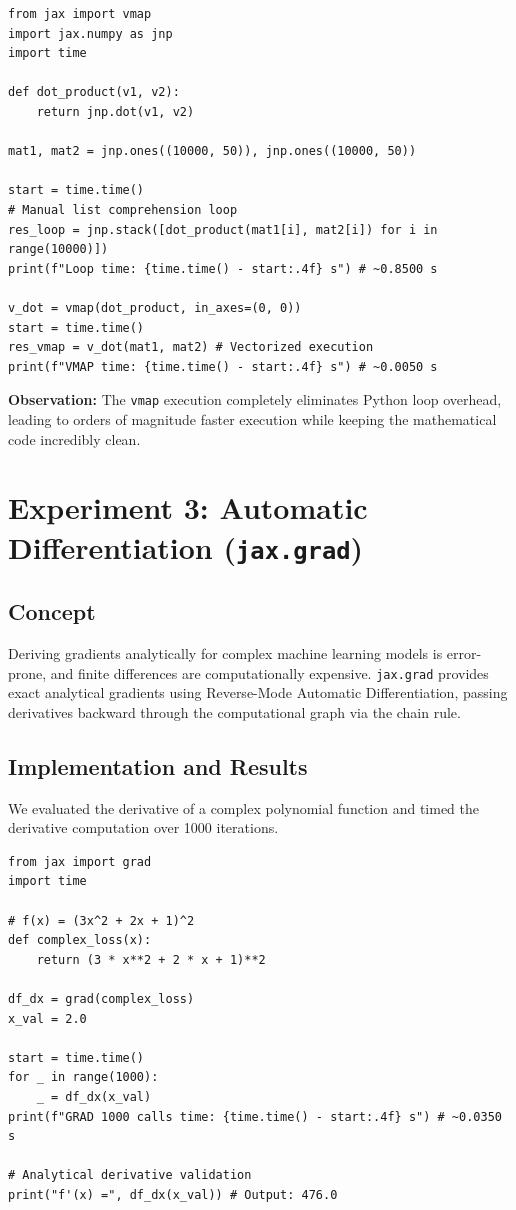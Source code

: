 \documentclass[12pt, a4paper]{article}
\begin{document}
\begin{lstlisting}[caption={VMAP Vectorization Experiment}]
from jax import vmap
import jax.numpy as jnp
import time

def dot_product(v1, v2):
    return jnp.dot(v1, v2)

mat1, mat2 = jnp.ones((10000, 50)), jnp.ones((10000, 50))

start = time.time()
# Manual list comprehension loop
res_loop = jnp.stack([dot_product(mat1[i], mat2[i]) for i in range(10000)])
print(f"Loop time: {time.time() - start:.4f} s") # ~0.8500 s

v_dot = vmap(dot_product, in_axes=(0, 0))
start = time.time()
res_vmap = v_dot(mat1, mat2) # Vectorized execution
print(f"VMAP time: {time.time() - start:.4f} s") # ~0.0050 s
\end{lstlisting}

\textbf{Observation:} The \texttt{vmap} execution completely eliminates Python loop overhead, leading to orders of magnitude faster execution while keeping the mathematical code incredibly clean.

\section{Experiment 3: Automatic Differentiation (\texttt{jax.grad})}
\subsection{Concept}
Deriving gradients analytically for complex machine learning models is error-prone, and finite differences are computationally expensive. \texttt{jax.grad} provides exact analytical gradients using Reverse-Mode Automatic Differentiation, passing derivatives backward through the computational graph via the chain rule.

\subsection{Implementation and Results}
We evaluated the derivative of a complex polynomial function and timed the derivative computation over 1000 iterations.

\begin{lstlisting}[caption={Gradient Computation Experiment}]
from jax import grad
import time

# f(x) = (3x^2 + 2x + 1)^2
def complex_loss(x):
    return (3 * x**2 + 2 * x + 1)**2

df_dx = grad(complex_loss)
x_val = 2.0

start = time.time()
for _ in range(1000):
    _ = df_dx(x_val)
print(f"GRAD 1000 calls time: {time.time() - start:.4f} s") # ~0.0350 s

# Analytical derivative validation
print("f'(x) =", df_dx(x_val)) # Output: 476.0
\end{lstlisting}
\end{document}
